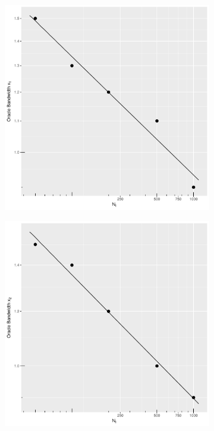 \begin{figure}[htbp]
    \centering
    \begin{subfigure}[t]{0.195\textwidth}
        \centering
        \captionsetup{width=.8\linewidth}%
        \includegraphics[width=\textwidth]{results/by_h_per_mu/oracle_bandwidth_x1_vs_mu.pdf}
    \end{subfigure}
    \begin{subfigure}[t]{0.195\textwidth}
        \centering
        \captionsetup{width=.8\linewidth}%
        \includegraphics[width=\textwidth]{results/by_h_per_mu/oracle_bandwidth_x2_vs_mu.pdf}

\end{subfigure}
\end{figure}
